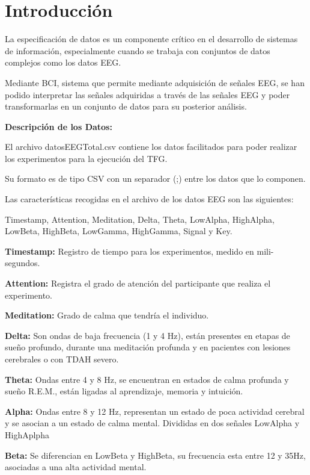 
\section{Introducción}

La especificación de datos es un componente crítico en el desarrollo de sistemas de información, especialmente cuando se trabaja con conjuntos de datos complejos como los datos EEG. 

Mediante BCI, sistema que permite mediante adquisición de señales EEG, se han podido interpretar las señales adquiridas a través de las señales EEG y poder transformarlas en un conjunto de datos para su posterior análisis.  



\textbf{Descripción de los Datos:}

El archivo datosEEGTotal.csv contiene los datos facilitados para poder realizar los experimentos para la ejecución del TFG.

Su formato es de tipo CSV con un separador (;) entre los datos que lo componen.

Las características recogidas en el archivo de los datos EEG son las siguientes:

Timestamp, Attention, Meditation, Delta, Theta, LowAlpha, HighAlpha, LowBeta, HighBeta, LowGamma, HighGamma, Signal y Key.

\textbf{Timestamp:} Registro de tiempo para los experimentos, medido en mili-segundos.

\textbf{Attention:} Registra el grado de atención del participante que realiza el experimento.

\textbf{Meditation:} Grado de calma que tendría el individuo.

\textbf{Delta:} Son ondas de baja frecuencia (1 y 4 Hz), están presentes en etapas de sueño profundo, durante una meditación profunda y en pacientes con lesiones cerebrales o con TDAH severo.

\textbf{Theta:} Ondas entre 4 y 8 Hz, se encuentran en estados de calma profunda y sueño R.E.M., están ligadas al aprendizaje, memoria y intuición.

\textbf{Alpha:} Ondas entre 8 y 12 Hz, representan un estado de poca actividad cerebral y se asocian a un estado de calma mental. Divididas en dos señales LowAlpha y HighAplpha

\textbf{Beta:} Se diferencian en LowBeta y HighBeta, su frecuencia esta entre 12 y 35Hz, asociadas a una alta actividad mental. 

